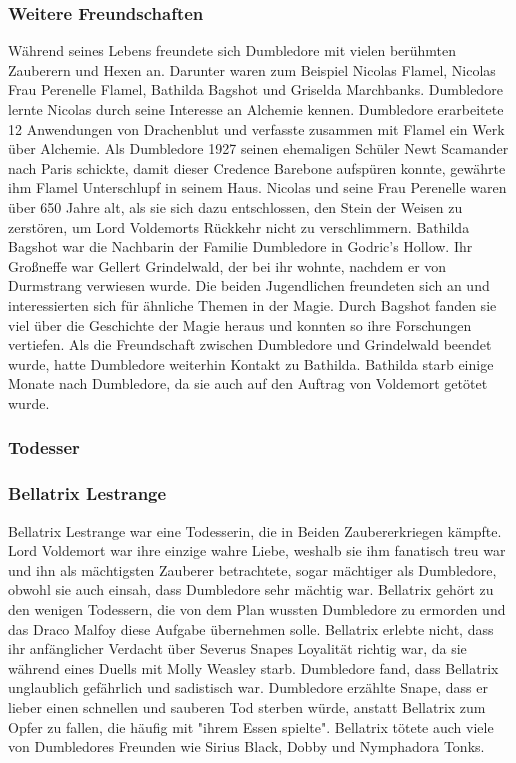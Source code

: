 \documentclass[a4paper, 10pt]{article}
\begin{document}
\subsubsection*{\large Weitere Freundschaften}
Während seines Lebens freundete sich Dumbledore mit vielen berühmten Zauberern und Hexen an. Darunter waren zum Beispiel Nicolas Flamel, Nicolas Frau Perenelle Flamel, Bathilda Bagshot und Griselda Marchbanks.
\vspace{10pt}
\newline
{}  
Dumbledore lernte Nicolas durch seine Interesse an Alchemie kennen. Dumbledore erarbeitete 12 Anwendungen von Drachenblut und verfasste zusammen mit Flamel ein Werk über Alchemie. Als Dumbledore 1927 seinen ehemaligen Schüler Newt Scamander nach Paris schickte, damit dieser Credence Barebone aufspüren konnte, gewährte ihm Flamel Unterschlupf in seinem Haus. Nicolas und seine Frau Perenelle waren über 650 Jahre alt, als sie sich dazu entschlossen, den Stein der Weisen zu zerstören, um Lord Voldemorts Rückkehr nicht zu verschlimmern.
\vspace{10pt}
\newline
{}  
Bathilda Bagshot war die Nachbarin der Familie Dumbledore in Godric's Hollow. Ihr Großneffe war Gellert Grindelwald, der bei ihr wohnte, nachdem er von Durmstrang verwiesen wurde. Die beiden Jugendlichen freundeten sich an und interessierten sich für ähnliche Themen in der Magie. Durch Bagshot fanden sie viel über die Geschichte der Magie heraus und konnten so ihre Forschungen vertiefen. Als die Freundschaft zwischen Dumbledore und Grindelwald beendet wurde, hatte Dumbledore weiterhin Kontakt zu Bathilda. Bathilda starb einige Monate nach Dumbledore, da sie auch auf den Auftrag von Voldemort getötet wurde.
\subsubsection*{\large Todesser}
\subsubsection*{Bellatrix Lestrange}
Bellatrix Lestrange war eine Todesserin, die in Beiden Zaubererkriegen kämpfte. Lord Voldemort war ihre einzige wahre Liebe, weshalb sie ihm fanatisch treu war und ihn als mächtigsten Zauberer betrachtete, sogar mächtiger als Dumbledore, obwohl sie auch einsah, dass Dumbledore sehr mächtig war. Bellatrix gehört zu den wenigen Todessern, die von dem Plan wussten Dumbledore zu ermorden und das Draco Malfoy diese Aufgabe übernehmen solle. Bellatrix erlebte nicht, dass ihr anfänglicher Verdacht über Severus Snapes Loyalität richtig war, da sie während eines Duells mit Molly Weasley starb. Dumbledore fand, dass Bellatrix unglaublich gefährlich und sadistisch war. Dumbledore erzählte Snape, dass er lieber einen schnellen und sauberen Tod sterben würde, anstatt Bellatrix zum Opfer zu fallen, die häufig mit "ihrem Essen spielte". Bellatrix tötete auch viele von Dumbledores Freunden wie Sirius Black, Dobby und Nymphadora Tonks.
\end{document}
